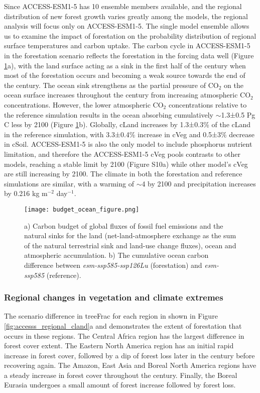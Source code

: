 \documentclass[draft]{agujournal2019}
\begin{document}
Since ACCESS-ESM1-5 has 10 ensemble members available, and the regional distribution of new forest growth varies greatly among the models, the regional analysis will focus only on ACCESS-ESM1-5.
The single model ensemble allows us to examine the impact of forestation on the probability distribution of regional surface temperatures and carbon uptake.
The carbon cycle in ACCESS-ESM1-5 in the forestation scenario reflects the forestation in the forcing data well (Figure \ref{fig:global_carbon_budget}a), with the land surface acting as a sink in the first half of the century when most of the forestation occurs and becoming a weak source towards the end of the century.
The ocean sink strengthens as the partial pressure of CO$_2$ on the ocean surface increases throughout the century from increasing atmospheric CO$_2$ concentrations.
However, the lower atmospheric CO$_2$ concentrations relative to the reference simulation results in the ocean absorbing cumulatively $\sim$1.3±0.5 Pg C less by 2100 (Figure \ref{fig:global_carbon_budget}b).
Globally, cLand increases by 1.3±0.3\% of the cLand in the reference simulation, with 3.3±0.4\% increase in cVeg and 0.5±3\% decrease in cSoil.
ACCESS-ESM1-5 is also the only model to include phosphorus nutrient limitation, and therefore the ACCESS-ESM1-5 cVeg pools contrasts to other models, reaching a stable limit by 2100 (Figure S10a) while other model's cVeg are still increasing by 2100.
The climate in both the forestation and reference simulations are similar, with a warming of $\sim$4 \textcelsius{} by 2100 and precipitation increases by 0.216 kg m$^{-2}$ day$^{-1}$.

\begin{figure}
    \texttt{[image: budget\_ocean\_figure.png]}
    \caption{a) Carbon budget of global fluxes of fossil fuel emissions and the natural sinks for the land (net-land-atmosphere exchange as the sum of the natural terrestrial sink and land-use change fluxes), ocean and atmospheric accumulation. b) The cumulative ocean carbon difference between \textit{esm-ssp585-ssp126Lu} (forestation) and \textit{esm-ssp585} (reference).}
    \label{fig:global_carbon_budget}
\end{figure}

\subsubsection{Regional changes in vegetation and climate extremes}

The scenario difference in treeFrac for each region in shown in Figure {\ref{fig:accesss_regional_cland}}a and demonstrates the extent of forestation that occurs in these regions.
The Central Africa region has the largest difference in forest cover extent.
The Eastern North America region has an initial rapid increase in forest cover, followed by a dip of forest loss later in the century before recovering again.
The Amazon, East Asia and Boreal North America regions have a steady increase in forest cover throughout the century.
Finally, the Boreal Eurasia undergoes a small amount of forest increase followed by forest loss.
\end{document}
